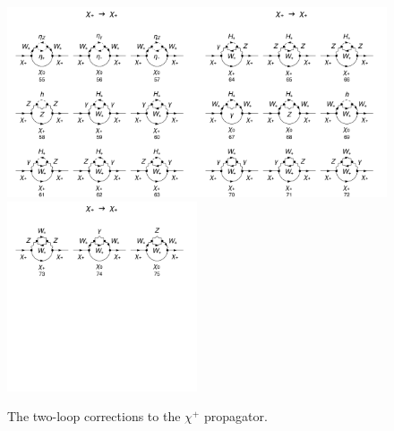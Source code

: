\documentclass[11pt]{article}
\begin{document}
\begin{figure}[h!]
\center
\includegraphics[width=0.5\textwidth]{diagrams_F[1]_2_7.pdf}\includegraphics[width=0.5\textwidth]{diagrams_F[1]_2_8.pdf}
\includegraphics[width=0.5\textwidth]{diagrams_F[1]_2_9.pdf}
\caption{The two-loop corrections to the $\chi^+$ propagator.}\label{fig:chi1chi1_2}
\end{figure}
\end{document}
